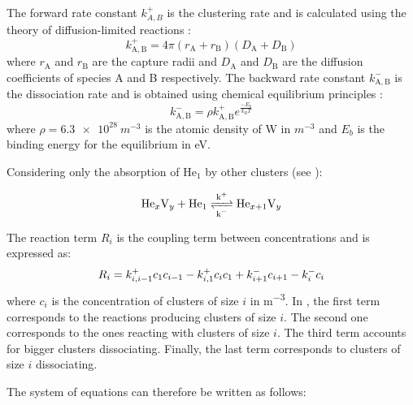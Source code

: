 The forward rate constant $k^+_{A,B}$ is the clustering rate and is calculated using the theory of diffusion-limited reactions :
\begin{equation}
    k^+_\mathrm{A,B} = 4 \pi (r_\mathrm{A} + r_\mathrm{B}) (D_\mathrm{A} + D_\mathrm{B})
\end{equation}
where $r_\mathrm{A}$ and $r_\mathrm{B}$ are the capture radii and $D_\mathrm{A}$ and $D_\mathrm{B}$ are the diffusion coefficients of species A and B respectively.
The backward rate constant $k^-_\mathrm{A,B}$ is the dissociation rate and is obtained using chemical equilibrium principles \cite{goldstein_diffusion_2007}:
\begin{equation}
    k^-_\mathrm{A,B} =\rho k^+_\mathrm{A,B}e^{\frac{-E_b}{k_B T}}
\end{equation}
where $\rho = \SI{6.3e28}{m^{-3}}$ is the atomic density of W in $\si{m^{-3}}$ and $E_b$ is the binding energy for the equilibrium  in \si{eV}.

Considering only the absorption of $\mathrm{He}_1$ by other clusters (see ):

\begin{equation}
    \ce{He_xV_y + He_1 <=>[k^+][k^-] He_{x+1}V_y}
\end{equation}

The reaction term $R_i$ is the coupling term between concentrations and is expressed as:
\begin{equation}
    R_i=  k^+_{i,i-1} c_1 c_{i-1}  - k_{i, 1}^+ c_i  c_{1} + k_{i+1}^- c_{i+1} -  k_i^- c_i
    \labeq{reaction term}
\end{equation}
where $c_i$ is the concentration of clusters of size $i$ in \si{m^{-3}}.
In , the first term corresponds to the reactions producing clusters of size $i$.
The second one corresponds to the ones reacting with clusters of size $i$.
The third term accounts for bigger clusters dissociating.
Finally, the last term corresponds to clusters of size $i$ dissociating.

The system of equations can therefore be written as follows:


